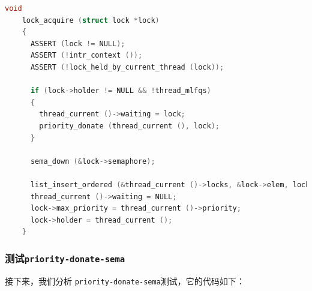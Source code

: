 \documentclass{article}
\begin{document}
\begin{lstlisting}[language=C, title=修改后的\texttt{lock\_acquire()}函数]
    void
    lock_acquire (struct lock *lock)
    {
      ASSERT (lock != NULL);
      ASSERT (!intr_context ());
      ASSERT (!lock_held_by_current_thread (lock));
    
      if (lock->holder != NULL && !thread_mlfqs)
      {
        thread_current ()->waiting = lock;
        priority_donate (thread_current (), lock);
      }
    
      sema_down (&lock->semaphore);
    
      list_insert_ordered (&thread_current ()->locks, &lock->elem, lock_priority_cmp, NULL);
      thread_current ()->waiting = NULL;
      lock->max_priority = thread_current ()->priority;
      lock->holder = thread_current ();
    }
\end{lstlisting}

\subsubsection{测试\texttt{priority-donate-sema}}

接下来，我们分析 \texttt{priority-donate-sema}测试，它的代码如下：
\end{document}
